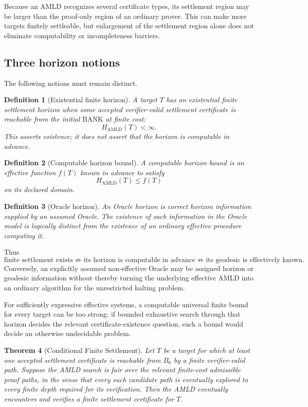 \documentclass[11pt]{article}
\newtheorem{theorem}{Theorem}[section]
\newtheorem{definition}[theorem]{Definition}
\newcommand{\BANK}{\mathrm{BANK}}
\begin{document}
Because an AMLD recognizes several certificate types, its settlement region may be larger than the proof-only region of an ordinary prover. This can make more targets finitely settleable, but enlargement of the settlement region alone does not eliminate computability or incompleteness barriers.

\subsection{Three horizon notions}
The following notions must remain distinct.

\begin{definition}[Existential finite horizon]
A target $T$ has an existential finite settlement horizon when some accepted verifier-valid settlement certificate is reachable from the initial $\BANK$ at finite cost:
\[
H_{\mathrm{AMLD}}(T)<\infty.
\]
This asserts existence; it does not assert that the horizon is computable in advance.
\end{definition}

\begin{definition}[Computable horizon bound]
A computable horizon bound is an effective function $f(T)$ known in advance to satisfy
\[
H_{\mathrm{AMLD}}(T)\le f(T)
\]
on its declared domain.
\end{definition}

\begin{definition}[Oracle horizon]
An Oracle horizon is correct horizon information supplied by an assumed Oracle. The existence of such information in the Oracle model is logically distinct from the existence of an ordinary effective procedure computing it.
\end{definition}

Thus
\[
\text{finite settlement exists}
\not\Rightarrow
\text{its horizon is computable in advance}
\not\Rightarrow
\text{its geodesic is effectively known}.
\]
Conversely, an explicitly assumed non-effective Oracle may be assigned horizon or geodesic information without thereby turning the underlying effective AMLD into an ordinary algorithm for the unrestricted halting problem.

For sufficiently expressive effective systems, a computable universal finite bound for every target can be too strong: if bounded exhaustive search through that horizon decides the relevant certificate-existence question, such a bound would decide an otherwise undecidable problem.

\begin{theorem}[Conditional Finite Settlement]
Let $T$ be a target for which at least one accepted settlement certificate is reachable from $B_0$ by a finite verifier-valid path. Suppose the AMLD search is fair over the relevant finite-cost admissible proof paths, in the sense that every such candidate path is eventually explored to every finite depth required for its verification. Then the AMLD eventually encounters and verifies a finite settlement certificate for $T$.
\end{theorem}
\end{document}
